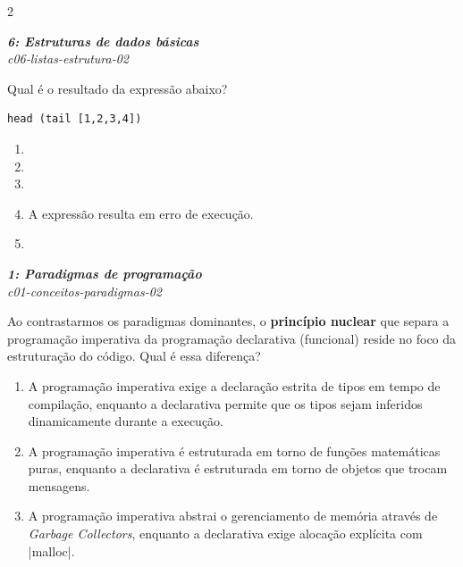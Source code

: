 \documentclass[a4paper,10pt,brazil]{article}
\begin{document}
\begin{multicols}{2}
\begin{flushright}
  \footnotesize
  \textit{\textbf{6: Estruturas de dados básicas}}\\
  \textit{c06-listas-estrutura-02}\\

\end{flushright}
Qual é o resultado da expressão abaixo?
\begin{verbatim}
head (tail [1,2,3,4])
\end{verbatim}

\begin{enumerate}
  \item {}

  \item {}

  \item {}

  \item A expressão resulta em erro de execução.

  \item \haskellinline{ [2,3,4] }


\end{enumerate}

\begin{flushright}
  \footnotesize
  \textit{\textbf{1: Paradigmas de programação}}\\
  \textit{c01-conceitos-paradigmas-02}\\

\end{flushright}
Ao contrastarmos os paradigmas dominantes, o \textbf{princípio nuclear} que separa a programação imperativa da programação declarativa (funcional) reside no foco da estruturação do código. Qual é essa diferença?

\begin{enumerate}
  \item A programação imperativa exige a declaração estrita de tipos em tempo de compilação, enquanto a declarativa permite que os tipos sejam inferidos dinamicamente durante a execução.

  \item A programação imperativa é estruturada em torno de funções matemáticas puras, enquanto a declarativa é estruturada em torno de objetos que trocam mensagens.

  \item A programação imperativa abstrai o gerenciamento de memória através de \emph{Garbage Collectors}, enquanto a declarativa exige alocação explícita com \cinline|malloc|.


\end{enumerate}
\end{multicols}
\end{document}
